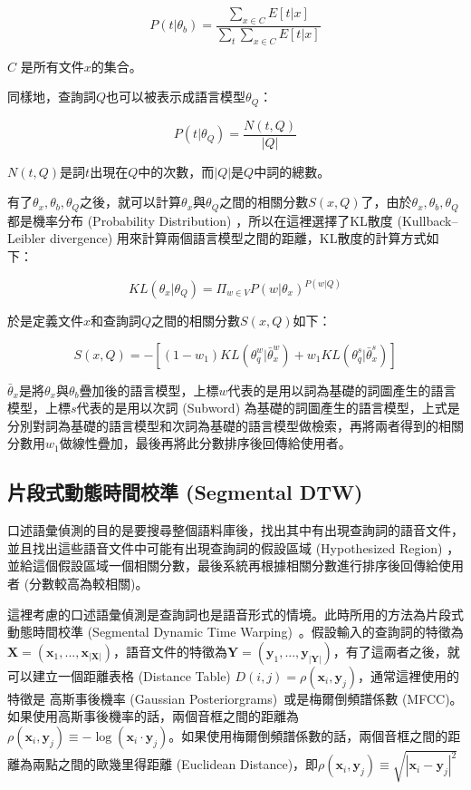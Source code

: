 \begin{equation}
P(t|\theta_b) = \frac{\sum_{x\in C}E[t|x]}{\sum_t\sum_{x\in C}E[t|x]}
\end{equation}

$C$ 是所有文件$x$的集合。

同樣地，查詢詞$Q$也可以被表示成語言模型$\theta_Q$：

\begin{equation}
P(t|\theta_Q) = \frac{N(t, Q)}{|Q|}   
\end{equation}

$N(t, Q)$是詞$t$出現在$Q$中的次數，而$|Q|$是$Q$中詞的總數。

有了$\theta_x, \theta_b, \theta_Q$之後，就可以計算$\theta_x$與$\theta_Q$之間的相關分數$S(x, Q)$了，由於$\theta_x, \theta_b, \theta_Q$都是機率分布 (Probability Distribution) ，所以在這裡選擇了KL散度 (Kullback–Leibler divergence) 用來計算兩個語言模型之間的距離，KL散度的計算方式如下：

\begin{equation}
KL(\theta_x | \theta_Q) = \Pi_{w\in V}P(w|\theta_x)^{P(w|Q)}
\end{equation}

於是定義文件$x$和查詢詞$Q$之間的相關分數$S(x, Q)$如下：

\begin{equation}
S(x, Q) = -[(1-w_1)KL(\theta_q^w|\bar{\theta}^w_x) + w_1KL(\theta_q^s|\bar{\theta}_x^s)]
\end{equation}

$\bar{\theta}_x$是將$\theta_x$與$\theta_b$疊加後的語言模型，上標$w$代表的是用以詞為基礎的詞圖產生的語言模型，上標$s$代表的是用以次詞 (Subword) 為基礎的詞圖產生的語言模型，上式是分別對詞為基礎的語言模型和次詞為基礎的語言模型做檢索，再將兩者得到的相關分數用$w_1$做線性疊加，最後再將此分數排序後回傳給使用者。

\subsection{片段式動態時間校準 (Segmental DTW)}
\label{sec:chap4_sdtw}
口述語彙偵測的目的是要搜尋整個語料庫後，找出其中有出現查詢詞的語音文件，並且找出這些語音文件中可能有出現查詢詞的假設區域 (Hypothesized Region) ，並給這個假設區域一個相關分數，最後系統再根據相關分數進行排序後回傳給使用者 (分數較高為較相關)。

這裡考慮的口述語彙偵測是查詢詞也是語音形式的情境。此時所用的方法為片段式動態時間校準 (Segmental Dynamic Time Warping)~\cite{chan2010unsupervised, hazen2009query}。假設輸入的查詢詞的特徵為$\mathbf{X} = (\mathbf{x}_1, ..., \mathbf{x}_{|\mathbf{X}|})$，語音文件的特徵為$\mathbf{Y} = (\mathbf{y}_1, ..., \mathbf{y}_{|\mathbf{Y}|})$，有了這兩者之後，就可以建立一個距離表格 (Distance Table) $D(i, j) = \rho(\mathbf{x}_i, \mathbf{y}_j)$，通常這裡使用的特徵是
高斯事後機率 (Gaussian Posteriorgrams)~\cite{zhang2009unsupervised}或是梅爾倒頻譜係數 (MFCC)。如果使用高斯事後機率的話，兩個音框之間的距離為 $\rho(\mathbf{x}_i, \mathbf{y}_j) \equiv -\log (\mathbf{x}_i \cdot \mathbf{y}_j)$。如果使用梅爾倒頻譜係數的話，兩個音框之間的距離為兩點之間的歐幾里得距離 (Euclidean Distance)，即$\rho(\mathbf{x}_i, \mathbf{y}_j) \equiv \sqrt{|\mathbf{x}_i - \mathbf{y}_j|^2}$

